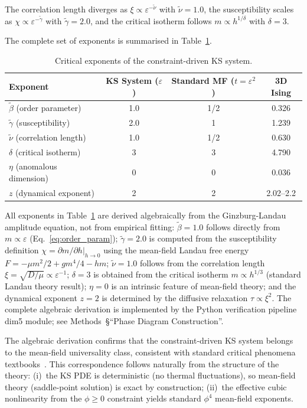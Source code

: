 \documentclass[sn-nature,pdflatex]{sn-jnl}
\begin{document}
The correlation length diverges as $\xi \propto \varepsilon^{-\tilde{\nu}}$ with $\tilde{\nu} = 1.0$, the susceptibility scales as $\chi \propto \varepsilon^{-\tilde{\gamma}}$ with $\tilde{\gamma} = 2.0$, and the critical isotherm follows $m \propto h^{1/\delta}$ with $\delta = 3$.

The complete set of exponents is summarised in Table~\ref{tab:critical_exponents}.

\begin{table}[htbp]
\centering
\caption{Critical exponents of the constraint-driven KS system.}
\label{tab:critical_exponents}
\begin{tabular}{lccc}
\toprule
Exponent & KS System ($\varepsilon$) & Standard MF ($t=\varepsilon^2$) & 3D Ising \\
\midrule
$\tilde{\beta}$ (order parameter)   & 1.0   & 1/2   & 0.326 \\
$\tilde{\gamma}$ (susceptibility)   & 2.0   & 1     & 1.239 \\
$\tilde{\nu}$ (correlation length)  & 1.0   & 1/2   & 0.630 \\
$\delta$ (critical isotherm)       & 3     & 3     & 4.790 \\
$\eta$ (anomalous dimension)       & 0     & 0     & 0.036 \\
$z$ (dynamical exponent)           & 2     & 2     & 2.02--2.2 \\
\bottomrule
\end{tabular}
\end{table}

All exponents in Table~\ref{tab:critical_exponents} are derived algebraically from the Ginzburg-Landau amplitude equation, not from empirical fitting: $\tilde{\beta}=1.0$ follows directly from $m \propto \varepsilon$ (Eq.~\ref{eq:order_param}); $\tilde{\gamma}=2.0$ is computed from the susceptibility definition $\chi = \partial m/\partial h|_{h\to 0}$ using the mean-field Landau free energy $F = -\mu m^2/2 + g m^4/4 - hm$; $\tilde{\nu}=1.0$ follows from the correlation length $\xi = \sqrt{D/\mu} \propto \varepsilon^{-1}$; $\delta=3$ is obtained from the critical isotherm $m \propto h^{1/3}$ (standard Landau theory result); $\eta=0$ is an intrinsic feature of mean-field theory; and the dynamical exponent $z=2$ is determined by the diffusive relaxation $\tau \propto \xi^2$. The complete algebraic derivation is implemented by the Python verification pipeline dim5 module; see Methods~\S``Phase Diagram Construction''.

The algebraic derivation confirms that the constraint-driven KS system belongs to the mean-field universality class, consistent with standard critical phenomena textbooks~\cite{chaikin_lubensky_1995,stanley_1971,goldenfeld_1992}. This correspondence follows naturally from the structure of the theory: (i)~the KS PDE is deterministic (no thermal fluctuations), so mean-field theory (saddle-point solution) is exact by construction; (ii)~the effective cubic nonlinearity from the $\phi \ge 0$ constraint yields standard $\phi^4$ mean-field exponents.
\end{document}
